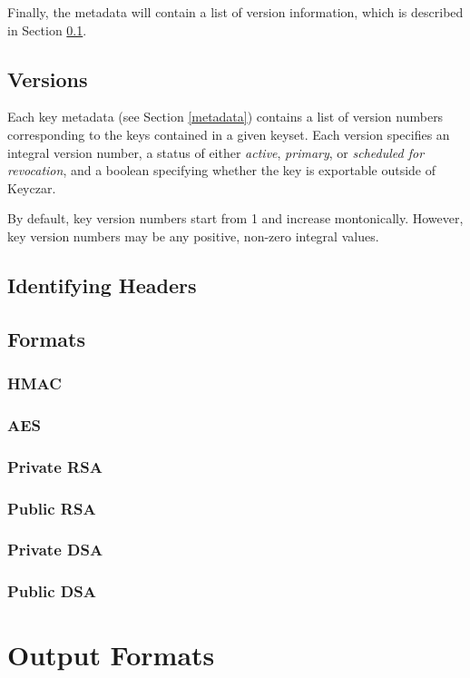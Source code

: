 \documentclass{llncs}
\begin{document}
Finally, the metadata will contain a list of version information, which is
described in Section \ref{versions}.

\subsection{Versions}\label{versions}

Each key metadata (see Section \ref{metadata}) contains a list of version
numbers corresponding to the keys contained in a given keyset. Each version
specifies an integral version number, a status of either {\it active}, {\it
primary}, or {\it scheduled for revocation}, and a boolean specifying whether
the key is exportable outside of Keyczar.

By default, key version numbers start from 1 and increase montonically.
However, key version numbers may be any positive, non-zero integral values.

\subsection{Identifying Headers}



\subsection{Formats}\label{formats}
\subsubsection{HMAC}
\subsubsection{AES}
\subsubsection{Private RSA}
\subsubsection{Public RSA}
\subsubsection{Private DSA}
\subsubsection{Public DSA}

\section{Output Formats}
\end{document}
